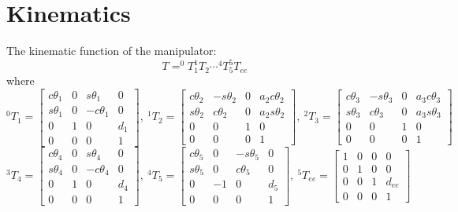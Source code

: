 \documentclass[utf8]{article}
\begin{document}
\section{Kinematics}
The kinematic function of the manipulator: 
$$T = ^0T_1 ^1T_2\cdots ^4T_5^5T_{ee}$$
where
\begin{equation}
^0T_1 = \left[
\begin{matrix}
c\theta_1 & 0 & s\theta_1  & 0\\
s\theta_1 & 0 & -c\theta_1 & 0\\
0         & 1 & 0          & d_1\\
0         & 0 & 0          & 1
\end{matrix}
\right],\ 
^1T_2 = \left[
\begin{matrix}
c\theta_2 & -s\theta_2 & 0 & a_2c\theta_2\\
s\theta_2 & c\theta_2  & 0 & a_2s\theta_2\\
0         & 0          & 1 & 0\\
0         & 0          & 0 & 1
\end{matrix}
\right],\ 
^2T_3 = \left[
\begin{matrix}
c\theta_3 & -s\theta_3 & 0 & a_3c\theta_3\\
s\theta_3 & c\theta_3 & 0 & a_3s\theta_3\\
0 & 0 & 1 & 0\\
0 & 0 & 0 & 1
\end{matrix}
\right]
\end{equation}
\begin{equation}
^3T_4 = \left[
\begin{matrix}
c\theta_4 & 0 &s\theta_4 & 0\\
s\theta_4 & 0 & -c\theta_4 & 0\\
0 & 1 & 0 & d_4\\
0 & 0 & 0 & 1
\end{matrix}
\right],\ 
^4T_5 = \left[
\begin{matrix}
c\theta_5 & 0 & -s\theta_5 & 0\\
s\theta_5 & 0 & c\theta_5 & 0\\
0 & -1 & 0 & d_5\\
0 & 0 & 0 & 1
\end{matrix}
\right],\ 
^5T_{ee} = \left[
\begin{matrix}
1 & 0 & 0 & 0\\
0 & 1 & 0 & 0\\
0 & 0 & 1 & d_{ee}\\
0 & 0 & 0 & 1
\end{matrix}
\right]
\end{equation}
\end{document}
